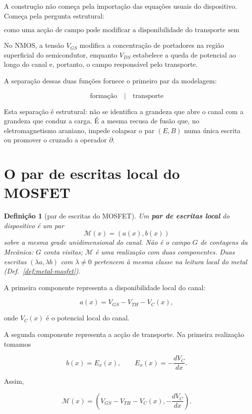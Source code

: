\documentclass[11pt,a4paper]{article}
\newtheorem{definicao}[teorema]{Definição}
\begin{document}
A construção não começa pela importação das equações usuais do
dispositivo. Começa pela pergunta estrutural:

\[
\boxed{
\text{como uma acção de campo pode modificar a disponibilidade
do transporte sem constituir, ela própria, o transporte?}
}
\]

No NMOS, a tensão \(V_{GS}\) modifica a concentração de portadores
na região superficial do semicondutor, enquanto \(V_{DS}\) estabelece
a queda de potencial ao longo do canal e, portanto, o campo responsável
pelo transporte.

A separação dessas duas funções fornece o primeiro par da modelagem:

\[
\boxed{
\text{formação}
\quad\big|\quad
\text{transporte}
}
\]

Esta separação é estrutural: não se identifica a grandeza que abre
o canal com a grandeza que conduz a carga. É a mesma recusa de fusão
que, no eletromagnetismo araniano, impede colapsar o par \((E,B)\)
numa única escrita ou promover o cruzado a operador \(\partial\).


\section{O par de escritas local do MOSFET}
\label{sec:par}

\begin{definicao}[par de escritas do MOSFET]
\label{def:par-mosfet}
Um \textbf{par de escritas local} do dispositivo é um par
\[
\mathcal M(x)=(a(x),b(x))
\]
sobre a mesma grade unidimensional do canal. \emph{Não é o campo \(G\)
de contagens da Mecânica}: \(G\) conta visitas; \(\mathcal M\) é uma
realização com duas componentes. Duas escritas \((\lambda a,\lambda b)\)
com \(\lambda\neq0\) pertencem à mesma classe na leitura local do metal
(Def.~\ref{def:metal-mosfet}).
\end{definicao}

A primeira componente representa a disponibilidade local do canal:

\[
a(x)=V_{GS}-V_{TH}-V_C(x),
\]

onde \(V_C(x)\) é o potencial local do canal.

A segunda componente representa a acção de transporte. Na primeira
realização tomamos

\[
b(x)=E_x(x),\qquad
E_x(x)=-\frac{dV_C}{dx}.
\]

Assim,

\[
\boxed{
\mathcal M(x)=
\left(
V_{GS}-V_{TH}-V_C(x),
-\frac{dV_C}{dx}
\right).
}
\]
\end{document}

